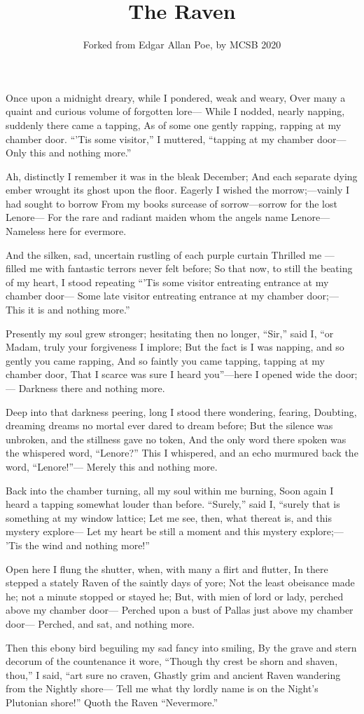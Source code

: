 \documentclass{article}
\title{The Raven}
\author{Forked from Edgar Allan Poe, by MCSB 2020}
\begin{document}
\maketitle

Once upon a midnight dreary, while I pondered, weak and weary, 
Over many a quaint and curious volume of forgotten lore—
While I nodded, nearly napping, suddenly there came a tapping,
As of some one gently rapping, rapping at my chamber door.
“’Tis some visitor,” I muttered, “tapping at my chamber door—
Only this and nothing more.”

Ah, distinctly I remember it was in the bleak December;
And each separate dying ember wrought its ghost upon the floor.
Eagerly I wished the morrow;—vainly I had sought to borrow
From my books surcease of sorrow—sorrow for the lost Lenore—
For the rare and radiant maiden whom the angels name Lenore—
Nameless here for evermore.

And the silken, sad, uncertain rustling of each purple curtain
Thrilled me — filled me with fantastic terrors never felt before;
So that now, to still the beating of my heart, I stood repeating
“’Tis some visitor entreating entrance at my chamber door—
Some late visitor entreating entrance at my chamber door;—
This it is and nothing more.”

Presently my soul grew stronger; hesitating then no longer,
“Sir,” said I, “or Madam, truly your forgiveness I implore;
But the fact is I was napping, and so gently you came rapping,
And so faintly you came tapping, tapping at my chamber door,
That I scarce was sure I heard you”—here I opened wide the door;—
Darkness there and nothing more.

Deep into that darkness peering, long I stood there wondering, fearing,
Doubting, dreaming dreams no mortal ever dared to dream before;
But the silence was unbroken, and the stillness gave no token,
And the only word there spoken was the whispered word, “Lenore?”
This I whispered, and an echo murmured back the word, “Lenore!”—
Merely this and nothing more.

Back into the chamber turning, all my soul within me burning,
Soon again I heard a tapping somewhat louder than before.
“Surely,” said I, “surely that is something at my window lattice;
Let me see, then, what thereat is, and this mystery explore—
Let my heart be still a moment and this mystery explore;—
’Tis the wind and nothing more!”

Open here I flung the shutter, when, with many a flirt and flutter,
In there stepped a stately Raven of the saintly days of yore;
Not the least obeisance made he; not a minute stopped or stayed he;
But, with mien of lord or lady, perched above my chamber door—
Perched upon a bust of Pallas just above my chamber door—
Perched, and sat, and nothing more.

Then this ebony bird beguiling my sad fancy into smiling,
By the grave and stern decorum of the countenance it wore,
“Though thy crest be shorn and shaven, thou,” I said, “art sure no craven,
Ghastly grim and ancient Raven wandering from the Nightly shore—
Tell me what thy lordly name is on the Night’s Plutonian shore!”
Quoth the Raven “Nevermore.”
\end{document}
